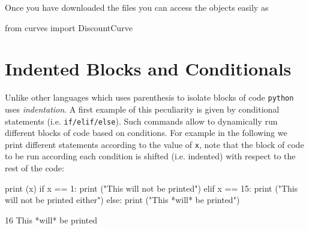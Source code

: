 
Once you have downloaded the files you can access the objects easily as

\begin{ipythonnon}
from curves import DiscountCurve
\end{ipythonnon}

%
%	
%

\section{Indented Blocks and Conditionals}
\label{indented-blocks-and-the-ttifelse-statement}

Unlike other languages which uses parenthesis to isolate blocks of code \texttt{python} uses \emph{indentation}. A first example of this peculiarity is given by conditional statements (i.e. \texttt{if/elif/else}). Such commands allow to dynamically run different blocks of code based on conditions. For example in the following we print different statements according to the value of \texttt{x}, note that the block of code to be run according each condition is shifted (i.e. indented) with respect to the rest of the code:

\begin{ipythonnon}
print (x)
if x == 1:
	print ("This will not be printed")
elif x == 15:
	print ("This will not be printed either")
else:
	print ("This *will* be printed")
\end{ipythonnon}
\begin{ioutput}
16
This *will* be printed	
\end{ioutput}

